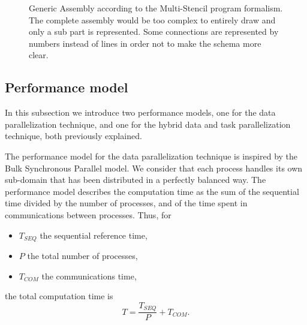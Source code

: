 \begin{figure}[t]
\begin{center}
\vspace*{.5em}
\caption{Generic Assembly according to the Multi-Stencil program formalism.
The complete assembly would be too complex to entirely draw and only a sub part is represented.
Some connections are represented by numbers instead of lines in order not to make the schema more clear.
}
\label{fig:specass}
\end{center}
\end{figure}

\subsection{Performance model}
\label{sect:perfs}

In this subsection we introduce two performance models, one for the data parallelization technique, and one for the hybrid data and task parallelization technique, both previously explained.

The performance model for the data parallelization technique is inspired by the Bulk Synchronous Parallel model.
We consider that each process handles its own sub-domain that has been distributed in a perfectly balanced way.
The performance model describes the computation time as the sum of the sequential time divided by the number of processes, and of the time spent in communications between processes. Thus, for
\begin{itemize}
\item $T_{SEQ}$ the sequential reference time, 
\item $P$ the total number of processes, 
\item $T_{COM}$ the communications time, 
\end{itemize}
the total computation time is
\begin{equation}
T = \frac{T_{SEQ}}{P} + T_{COM}.
\end{equation}


